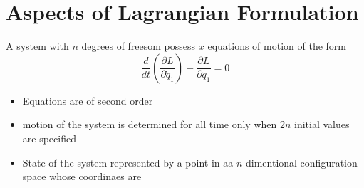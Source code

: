 \section{Aspects of Lagrangian Formulation}
A system with $n$ degrees of freesom possess $x$ equations of motion of the form
$$\frac{d}{dt}\left( \frac{\partial L}{\partial \dot{q}_1}\right)-\frac{\partial L}{\partial q_1}=0 $$
\begin{itemize}
	\item Equations are of second order
	\item motion of the system is determined for all time only when $2n$ initial values are specified
	\item State of the system represented by a point in aa $n$ dimentional configuration space whose coordinaes are 
\end{itemize}